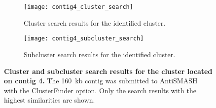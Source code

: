     \begin{figure}[htpb]
        \centering
        \begin{subfigure}[b]{\textwidth}
            \texttt{[image: contig4\_cluster\_search]}
            \caption{Cluster search results for the identified cluster.}
            \label{fig:sub1}
        \end{subfigure}

        \begin{subfigure}[b]{\textwidth}
            \texttt{[image: contig4\_subcluster\_search]}
            \caption{Subcluster search results for the identified cluster.}
            \label{fig:sub2}
        \end{subfigure}

        \caption[Cluster and subcluster search results for the cluster located on contig 4.]{\textbf{Cluster and subcluster search results for the cluster located on contig 4.} The 160~kb contig was submitted to AntiSMASH with the ClusterFinder option. Only the search results with the highest similarities are shown.}
        \label{fig:cluster_search}
    \end{figure}




